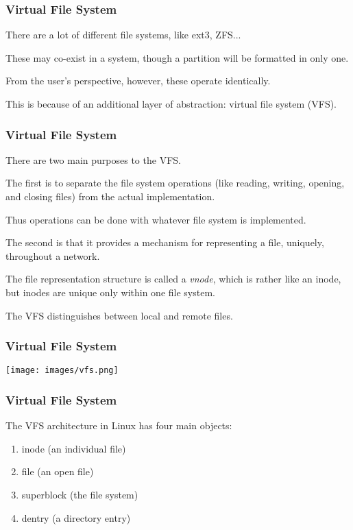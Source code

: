 \begin{frame}
\frametitle{Virtual File System}

There are a lot of different file systems, like ext3, ZFS... 

These may co-exist in a system, though a partition will be formatted in only one.

From the user's perspective, however, these operate identically. 

This is because of an additional layer of abstraction: virtual file system (VFS). 

\end{frame}

\begin{frame}
\frametitle{Virtual File System}

There are two main purposes to the VFS. 

The first is to separate the file system operations (like reading, writing, opening, and closing files) from the actual implementation. 

Thus operations can be done with whatever file system is implemented. 

The second is that it provides a mechanism for representing a file, uniquely, throughout a network. 

The file representation structure is called a \textit{vnode}, which is rather like an inode, but inodes are unique only within one file system. 

The VFS distinguishes between local and remote files.

\end{frame}

\begin{frame}
\frametitle{Virtual File System}

\begin{center}
	\texttt{[image: images/vfs.png]}
\end{center}


\end{frame}

\begin{frame}
\frametitle{Virtual File System}

The VFS architecture in Linux has four main objects:

\begin{enumerate}
	\item inode (an individual file)
	\item file (an open file)
	\item superblock (the file system)
	\item dentry (a directory entry)
\end{enumerate}



\end{frame}

